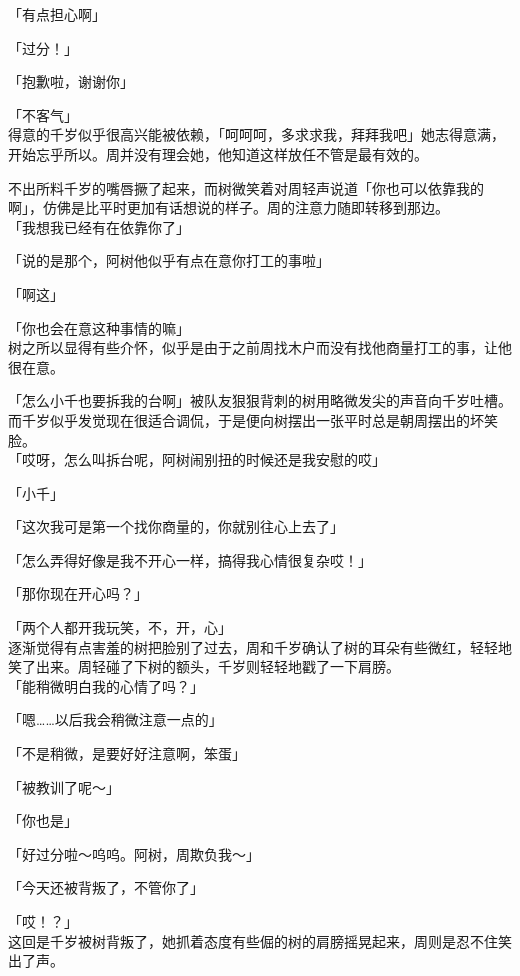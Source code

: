 「有点担心啊」

「过分！」

「抱歉啦，谢谢你」

「不客气」\\

得意的千岁似乎很高兴能被依赖，「呵呵呵，多求求我，拜拜我吧」她志得意满，开始忘乎所以。周并没有理会她，他知道这样放任不管是最有效的。

不出所料千岁的嘴唇撅了起来，而树微笑着对周轻声说道「你也可以依靠我的啊」，仿佛是比平时更加有话想说的样子。周的注意力随即转移到那边。\\

「我想我已经有在依靠你了」

「说的是那个，阿树他似乎有点在意你打工的事啦」

「啊这」

「你也会在意这种事情的嘛」\\

树之所以显得有些介怀，似乎是由于之前周找木户而没有找他商量打工的事，让他很在意。

「怎么小千也要拆我的台啊」被队友狠狠背刺的树用略微发尖的声音向千岁吐槽。而千岁似乎发觉现在很适合调侃，于是便向树摆出一张平时总是朝周摆出的坏笑脸。\\

「哎呀，怎么叫拆台呢，阿树闹别扭的时候还是我安慰的哎」

「小千」

「这次我可是第一个找你商量的，你就别往心上去了」

「怎么弄得好像是我不开心一样，搞得我心情很复杂哎！」

「那你现在开心吗？」

「两个人都开我玩笑，不，开，心」\\

逐渐觉得有点害羞的树把脸别了过去，周和千岁确认了树的耳朵有些微红，轻轻地笑了出来。周轻碰了下树的额头，千岁则轻轻地戳了一下肩膀。\\

「能稍微明白我的心情了吗？」

「嗯……以后我会稍微注意一点的」

「不是稍微，是要好好注意啊，笨蛋」

「被教训了呢～」

「你也是」

「好过分啦～呜呜。阿树，周欺负我～」

「今天还被背叛了，不管你了」

「哎！？」\\

这回是千岁被树背叛了，她抓着态度有些倔的树的肩膀摇晃起来，周则是忍不住笑出了声。


